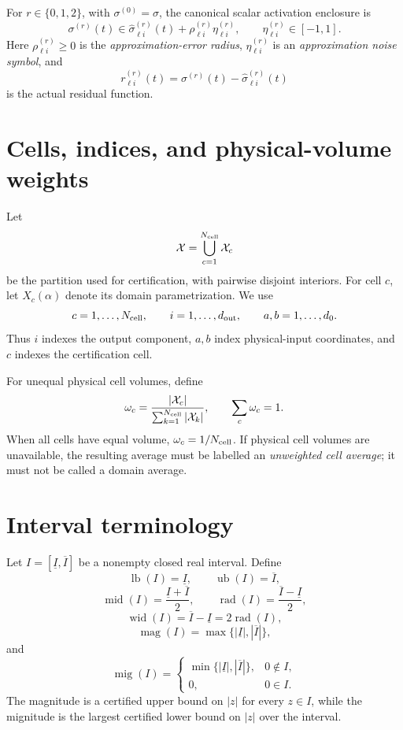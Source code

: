 \documentclass[11pt]{article}
\newcommand{\lb}{\operatorname{lb}}
\newcommand{\ub}{\operatorname{ub}}
\newcommand{\midp}{\operatorname{mid}}
\newcommand{\rad}{\operatorname{rad}}
\newcommand{\wid}{\operatorname{wid}}
\newcommand{\magI}{\operatorname{mag}}
\newcommand{\mig}{\operatorname{mig}}
\begin{document}
For \(r\in\{0,1,2\}\), with \(\sigma^{(0)}=\sigma\), the canonical scalar
activation enclosure is
\[
 \sigma^{(r)}(t)
 \in \widehat\sigma_{\ell i}^{(r)}(t)
      +\rho_{\ell i}^{(r)}\eta_{\ell i}^{(r)},
 \qquad \eta_{\ell i}^{(r)}\in[-1,1].
\]
Here \(\rho_{\ell i}^{(r)}\geq0\) is the
\emph{approximation-error radius}, \(\eta_{\ell i}^{(r)}\) is an
\emph{approximation noise symbol}, and
\[
 r_{\ell i}^{(r)}(t)
 =\sigma^{(r)}(t)-\widehat\sigma_{\ell i}^{(r)}(t)
\]
is the actual residual function.

\section{Cells, indices, and physical-volume weights}

Let
\[
 \mathcal X=\bigcup_{c=1}^{N_{\rm cell}}\mathcal X_c
\]
be the partition used for certification, with pairwise disjoint interiors.
For cell \(c\), let \(X_c(\alpha)\) denote its domain parametrization.  We use
\[
 c=1,\ldots,N_{\rm cell},\qquad
 i=1,\ldots,d_{\rm out},\qquad
 a,b=1,\ldots,d_0.
\]
Thus \(i\) indexes the output component, \(a,b\) index physical-input
coordinates, and \(c\) indexes the certification cell.

For unequal physical cell volumes, define
\[
 \omega_c
 =\frac{|\mathcal X_c|}{\sum_{k=1}^{N_{\rm cell}}|\mathcal X_k|},
 \qquad \sum_c\omega_c=1.
\]
When all cells have equal volume, \(\omega_c=1/N_{\rm cell}\).  If physical
cell volumes are unavailable, the resulting average must be labelled an
\emph{unweighted cell average}; it must not be called a domain average.

\section{Interval terminology}

Let \(I=[\underline I,\overline I]\) be a nonempty closed real interval.
Define
\[
 \lb(I)=\underline I,\qquad \ub(I)=\overline I,
\]
\[
 \midp(I)=\frac{\underline I+\overline I}{2},\qquad
 \rad(I)=\frac{\overline I-\underline I}{2},
\]
\[
 \wid(I)=\overline I-\underline I=2\rad(I),
\]
\[
 \magI(I)=\max\{|\underline I|,|\overline I|\},
\]
and
\[
 \mig(I)=
 \begin{cases}
  \min\{|\underline I|,|\overline I|\},&0\notin I,\\
  0,&0\in I.
 \end{cases}
\]
The magnitude is a certified upper bound on \(|z|\) for every \(z\in I\),
while the mignitude is the largest certified lower bound on \(|z|\) over the
interval.
\end{document}
